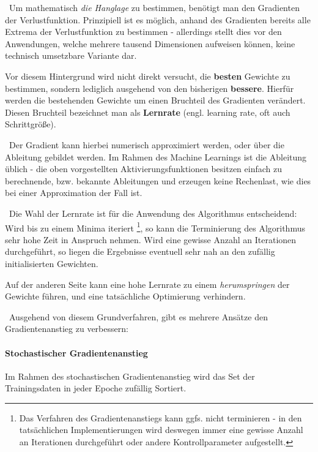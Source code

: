 ~\newline Um mathematisch \textit{die Hanglage} zu bestimmen, benötigt man den Gradienten der Verlustfunktion. Prinzipiell ist es möglich, anhand des Gradienten bereits alle Extrema der Verlustfunktion zu bestimmen - allerdings stellt dies vor den Anwendungen, welche mehrere tausend Dimensionen aufweisen können, keine technisch umsetzbare Variante dar. 

Vor diesem Hintergrund wird nicht direkt versucht, die \textbf{besten} Gewichte zu bestimmen, sondern lediglich ausgehend von den bisherigen \textbf{bessere}. Hierfür werden die bestehenden Gewichte um einen Bruchteil des Gradienten verändert. Diesen Bruchteil bezeichnet man als \textbf{Lernrate} (engl. learning rate, oft auch Schrittgröße).

~\newline Der Gradient kann hierbei numerisch approximiert werden, oder über die Ableitung gebildet werden. Im Rahmen des Machine Learnings ist die Ableitung üblich - die oben vorgestellten Aktivierungsfunktionen besitzen einfach zu berechnende, bzw. bekannte Ableitungen und erzeugen keine Rechenlast, wie dies bei einer Approximation der Fall ist.

~\newline Die Wahl der Lernrate ist für die Anwendung des Algorithmus entscheidend: Wird bis zu einem Minima iteriert \footnote{Das Verfahren des Gradientenanstiegs kann ggfs. nicht terminieren - in den tatsächlichen Implementierungen wird deswegen immer eine gewisse Anzahl an Iterationen durchgeführt oder andere Kontrollparameter aufgestellt.}, so kann die Terminierung des Algorithmus sehr hohe Zeit in Anspruch nehmen. Wird eine gewisse Anzahl an Iterationen durchgeführt, so liegen die Ergebnisse eventuell sehr nah an den zufällig initialisierten Gewichten.

Auf der anderen Seite kann eine hohe Lernrate zu einem \textit{herumspringen} der Gewichte führen, und eine tatsächliche Optimierung verhindern.

~\newline Ausgehend von diesem Grundverfahren, gibt es mehrere Ansätze den Gradientenanstieg zu verbessern:

\paragraph{Stochastischer Gradientenanstieg}
Im Rahmen des stochastischen Gradientenanstieg wird das Set der Trainingsdaten in jeder Epoche zufällig Sortiert. 

